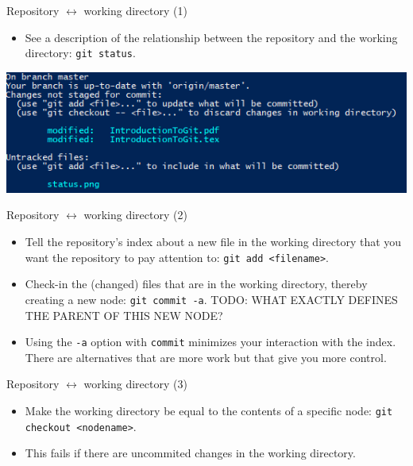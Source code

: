 \documentclass[usenames,dvipsnames]{beamer}
\newcommand{\code}[1]{\colorbox{light-gray}{\texttt{#1}}}
\begin{document}
\begin{frame}{Repository $\leftrightarrow$ working directory (1)}
  \begin{block}{}
    \begin{itemize}
      \item{See a description of the relationship between the repository and the working directory: \code{git status}.}
    \end{itemize}
  \end{block}
  \begin{block}{}
    \begin{center}
      \includegraphics[scale=0.8]{status.png}
    \end{center}
  \end{block}
\end{frame}

\begin{frame}{Repository $\leftrightarrow$ working directory (2)}
  \begin{block}{}
    \begin{itemize}
      \item{Tell the repository's index about a new file in the working directory that you want the repository to pay attention to: \code{git add <filename>}.}
      \item{Check-in the (changed) files that are in the working directory, thereby creating a new node: \code{git commit -a}. TODO: WHAT EXACTLY DEFINES THE PARENT OF THIS NEW NODE?}
      \item{Using the \code{-a} option with \code{commit} minimizes your interaction with the index. There are alternatives that are more work but that give you more control.}
    \end{itemize}
  \end{block}
\end{frame}

\begin{frame}{Repository $\leftrightarrow$ working directory (3)}
  \begin{block}{}
    \begin{itemize}
      \item{Make the working directory be equal to the contents of a specific node: \code{git checkout <nodename>}.}
      \item{This fails if there are uncommited changes in the working directory.}
    \end{itemize}
  \end{block}
\end{frame}
\end{document}
